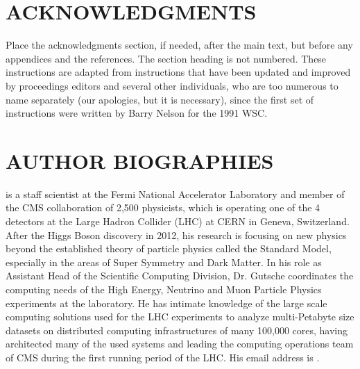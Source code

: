 \documentclass{wscpaperproc}
\theoremstyle{wsc}
\begin{document}
\section*{ACKNOWLEDGMENTS}
Place the acknowledgments section, if needed, after the main text, but before any appendices and the references. The section heading is not numbered.
These instructions are adapted from instructions that have been updated and improved by proceedings editors and several other individuals, who are too numerous to name separately (our apologies, but it is necessary), since the first set of instructions were written by Barry Nelson for the 1991 WSC.

\appendix





\section*{AUTHOR BIOGRAPHIES}

 is a staff scientist at the Fermi National Accelerator Laboratory and member of the CMS collaboration of 2,500 physicists, which is operating one of the 4 detectors at the Large Hadron Collider (LHC) at CERN in Geneva, Switzerland. After the Higgs Boson discovery in 2012, his research is focusing on new physics beyond the established theory of particle physics called the Standard Model, especially in the areas of Super Symmetry and Dark Matter. In his role as Assistant Head of the Scientific Computing Division, Dr. Gutsche coordinates the computing needs of the High Energy, Neutrino and Muon Particle Physics experiments at the laboratory. He has intimate knowledge of the large scale computing solutions used for the LHC experiments to analyze multi-Petabyte size datasets on distributed computing infrastructures of many 100,000 cores, having architected many of the used systems and leading the computing operations team of CMS during the first running period of the LHC. His email address is .\\
\end{document}
